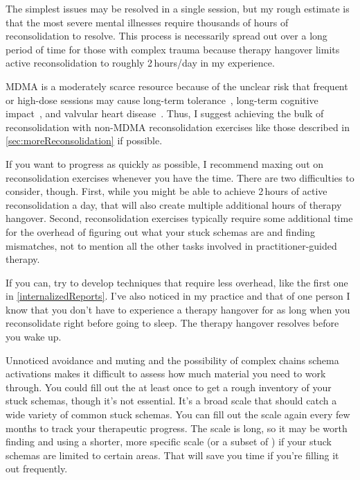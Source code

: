 \documentclass[11pt,oneside]{book}
\let\cite\parencite
\begin{document}
The simplest issues may be resolved in a single session, but my rough estimate is that the most severe mental illnesses require thousands of hours of reconsolidation to resolve. This process is necessarily spread out over a long period of time for those with complex trauma because therapy hangover limits active reconsolidation to roughly 2\,hours/day in my experience.

MDMA is a moderately scarce resource because of the unclear risk that frequent or high-dose sessions may cause long-term tolerance~\cite{farreTolerance,parrottTolerance}, long-term cognitive impact~\cite{corayMemory}, and valvular heart disease~\cite{droogmans2007valvular}. Thus, I suggest achieving the bulk of reconsolidation with non-MDMA reconsolidation exercises like those described in \cref{sec:moreReconsolidation} if possible.

If you want to progress as quickly as possible, I recommend maxing out on reconsolidation exercises whenever you have the time. There are two difficulties to consider, though. First, while you might be able to achieve 2\,hours of active reconsolidation a day, that will also create multiple additional hours of therapy hangover. Second, reconsolidation exercises typically require some additional time for the overhead of figuring out what your stuck schemas are and finding mismatches, not to mention all the other tasks involved in practitioner-guided therapy.

If you can, try to develop techniques that require less overhead, like the first one in \cref{internalizedReports}. I've also noticed in my practice and that of one person I know that you don't have to experience a therapy hangover for as long when you reconsolidate right before going to sleep. The therapy hangover resolves before you wake up.

Unnoticed avoidance and muting and the possibility of complex chains schema activations makes it difficult to assess how much material you need to work through. You could fill out the \textcite{maladaptiveSchemaScale} at least once to get a rough inventory of your stuck schemas, though it's not essential. It's a broad scale that should catch a wide variety of common stuck schemas. You can fill out the scale again every few months to track your therapeutic progress. The scale is long, so it may be worth finding and using a shorter, more specific scale (or a subset of \textcite{maladaptiveSchemaScale}) if your stuck schemas are limited to certain areas. That will save you time if you're filling it out frequently.
\end{document}

